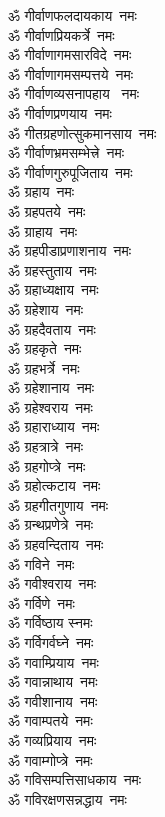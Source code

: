 \begin{multicols}{2}
\begin{flushleft}
ॐ गीर्वाणफलदायकाय~नमः\hfill{}\\
ॐ गीर्वाणप्रियकर्त्रे~नमः\\
ॐ गीर्वाणागमसारविदे~नमः\\
ॐ गीर्वाणागमसम्पत्तये~नमः\\
ॐ गीर्वाणव्यसनापहाय ~नमः\\
ॐ गीर्वाणप्रणयाय~नमः\\
ॐ गीतग्रहणोत्सुकमानसाय~नमः\\
ॐ गीर्वाणभ्रमसम्भेत्त्रे~नमः\\
ॐ गीर्वाणगुरुपूजिताय~नमः\\
ॐ ग्रहाय~नमः\\
ॐ ग्रहपतये~नमः\hfill{}\\
ॐ ग्राहाय~नमः\\
ॐ ग्रहपीडाप्रणाशनाय~नमः\\
ॐ ग्रहस्तुताय~नमः\\
ॐ ग्रहाध्यक्षाय~नमः\\
ॐ ग्रहेशाय~नमः\\
ॐ ग्रहदैवताय~नमः\\
ॐ ग्रहकृते~नमः\\
ॐ ग्रहभर्त्रे~नमः\\
ॐ ग्रहेशानाय~नमः\\
ॐ ग्रहेश्वराय~नमः\hfill{}\\
ॐ ग्रहाराध्याय~नमः\\
ॐ ग्रहत्रात्रे~नमः\\
ॐ ग्रहगोप्त्रे~नमः\\
ॐ ग्रहोत्कटाय~नमः\\
ॐ ग्रहगीतगुणाय~नमः\\
ॐ ग्रन्थप्रणेत्रे~नमः\\
ॐ ग्रहवन्दिताय~नमः\\
ॐ गविने~नमः\\
ॐ गवीश्वराय~नमः\\
ॐ गर्विणे~नमः\hfill{}\\
ॐ गर्विष्ठाय स्नमः\\
ॐ गर्विगर्वघ्ने~नमः\\
ॐ गवाम्प्रियाय~नमः\\
ॐ गवान्नाथाय~नमः\\
ॐ गवीशानाय~नमः\\
ॐ  गवाम्पतये~नमः\\
ॐ गव्यप्रियाय~नमः\\
ॐ गवाम्गोप्त्रे~नमः\\
ॐ गविसम्पत्तिसाधकाय~नमः\\
ॐ गविरक्षणसन्नद्धाय~नमः\hfill{}\\

\end{flushleft}
\end{multicols}

